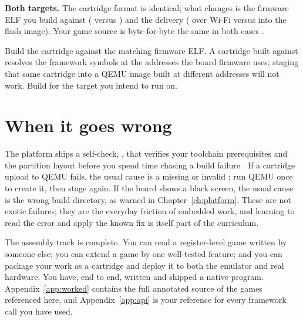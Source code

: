 \begin{prgtargets}
\textbf{Both targets.} The cartridge format is identical; what changes is the
firmware ELF you build against ( versus )
and the delivery ( over Wi-Fi versus  into the
flash image). Your game source is byte-for-byte the same in both cases
\citep{prg32qemu}.
\end{prgtargets}

\begin{prgwarn}
Build the cartridge against the matching firmware ELF. A cartridge built against
 resolves the framework symbols at the addresses
the board firmware uses; staging that same cartridge into a QEMU image built at
different addresses will not work. Build for the target you intend to run on.
\end{prgwarn}

\section{When it goes wrong}

The platform ships a self-check, , that
verifies your toolchain prerequisites and the partition layout before you spend
time chasing a build failure \citep{prg32repo}. If a cartridge upload to QEMU
fails, the usual cause is a missing or invalid ;
run QEMU once to create it, then stage again. If the board shows a black screen,
the usual cause is the wrong build directory, as warned in
Chapter~\ref{ch:platform}. These are not exotic failures; they are the everyday
friction of embedded work, and learning to read the error and apply the known fix
is itself part of the curriculum.

\begin{prgcheck}
The assembly track is complete. You can read a register-level game written by
someone else; you can extend a game by one well-tested feature; and you can
package your work as a cartridge and deploy it to both the emulator and real
hardware. You have, end to end, written and shipped a native \riscv program.
Appendix~\ref{app:worked} contains the full annotated source of the games
referenced here, and Appendix~\ref{app:api} is your reference for every framework
call you have used.
\end{prgcheck}
